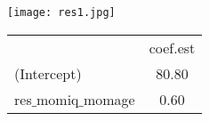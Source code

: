 \documentclass[xcolor=dvipsnames]{beamer}
\begin{document}
\begin{frame}
 \begin{minipage}{\textwidth}
 \begin{minipage}[b]{0.49\textwidth}
    \centering
     \texttt{[image: res1.jpg]}
  \end{minipage}
  \hfill
 \begin{minipage}[b]{.5\textwidth}
    \centering
   \begin{tabular}{|l c |}
\hline
 & coef.est \\

(Intercept) &  80.80   \\
res$\_$momiq$\_$momage &  0.60   \\
\hline
     \end{tabular}
  \end{minipage}
\end{minipage}
\end{frame}  
\end{document}
